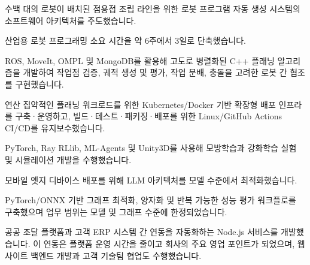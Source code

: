 \documentclass[10pt,a4paper]{article}
\begin{document}
\begin{cvbullets}
  \item 수백 대의 로봇이 배치된 점용접 조립 라인을 위한 로봇 프로그램 자동 생성 시스템의 소프트웨어 아키텍처를 주도했습니다.
  \item 산업용 로봇 프로그래밍 소요 시간을 약 6주에서 3일로 단축했습니다.
  \item ROS, MoveIt, OMPL 및 MongoDB를 활용해 고도로 병렬화된 C++ 플래닝 알고리즘을 개발하여 작업점 검증, 궤적 생성 및 평가, 작업 분배, 충돌을 고려한 로봇 간 협조를 구현했습니다.
  \item 연산 집약적인 플래닝 워크로드를 위한 Kubernetes/Docker 기반 확장형 배포 인프라를 구축·운영하고, 빌드·테스트·패키징·배포를 위한 Linux/GitHub Actions CI/CD를 유지보수했습니다.
  \item PyTorch, Ray RLlib, ML-Agents 및 Unity3D를 사용해 모방학습과 강화학습 실험 및 시뮬레이션 개발을 수행했습니다.
  \item 모바일 엣지 디바이스 배포를 위해 LLM 아키텍처를 모델 수준에서 최적화했습니다.
  \item PyTorch/ONNX 기반 그래프 최적화, 양자화 및 반복 가능한 성능 평가 워크플로를 구축했으며 업무 범위는 모델 및 그래프 수준에 한정되었습니다.
\end{cvbullets}

\begin{cvbullets}
  \item 공공 조달 플랫폼과 고객 ERP 시스템 간 연동을 자동화하는 Node.js 서비스를 개발했습니다. 이 연동은 플랫폼 운영 시간을 줄이고 회사의 주요 영업 포인트가 되었으며, 웹사이트 백엔드 개발과 고객 기술팀 협업도 수행했습니다.
\end{cvbullets}


\end{document}
